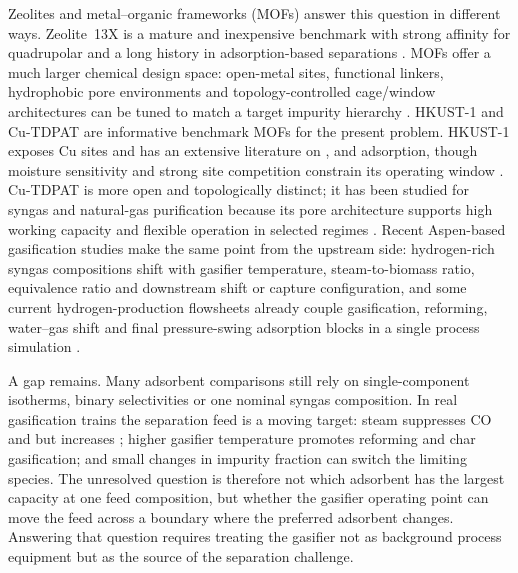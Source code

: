 \documentclass[11pt,a4paper]{article}
\newcommand{\Htwo}{\ce{H2}}
\newcommand{\COtwo}{\ce{CO2}}
\newcommand{\CHfour}{\ce{CH4}}
\newcommand{\PSA}{pressure-swing adsorption}
\begin{document}
Zeolites and metal--organic frameworks (MOFs) answer this question in different ways. Zeolite~13X is a mature and inexpensive benchmark with strong affinity for quadrupolar \COtwo{} and a long history in adsorption-based separations \citep{Streb2021Zeolite13X,Delgado2014PSAH2,Jedli2024Zeolite13X,Yang2025Layered13X}. MOFs offer a much larger chemical design space: open-metal sites, functional linkers, hydrophobic pore environments and topology-controlled cage/window architectures can be tuned to match a target impurity hierarchy \citep{Li2014MOFGasSeparation,AlNaddaf2018CoreShell,AlNaddaf2020Multicomponent}. HKUST-1 and Cu-TDPAT are informative benchmark MOFs for the present problem. HKUST-1 exposes Cu sites and has an extensive literature on \COtwo, \CHfour{} and \Htwo{} adsorption, though moisture sensitivity and strong site competition constrain its operating window \citep{Abid2023HKUST,Yin2018HKUSTCO,Zelenka2022HKUSTAmine,Rostom2024CuBTC}. Cu-TDPAT is more open and topologically distinct; it has been studied for syngas and natural-gas purification because its pore architecture supports high working capacity and flexible operation in selected regimes \citep{Wu2012CuTDPAT,Liu2014CuTDPAT,Asgari2021CuTDPAT}. Recent Aspen-based gasification studies make the same point from the upstream side: hydrogen-rich syngas compositions shift with gasifier temperature, steam-to-biomass ratio, equivalence ratio and downstream shift or capture configuration, and some current hydrogen-production flowsheets already couple gasification, reforming, water--gas shift and final \PSA{} blocks in a single process simulation \citep{Rosha2023MSWGasificationMEA,Matta2024OlivePomaceAspen}.

A gap remains. Many adsorbent comparisons still rely on single-component isotherms, binary selectivities or one nominal syngas composition. In real gasification trains the separation feed is a moving target: steam suppresses CO and \CHfour{} but increases \COtwo; higher gasifier temperature promotes reforming and char gasification; and small changes in impurity fraction can switch the limiting species. The unresolved question is therefore not which adsorbent has the largest capacity at one feed composition, but whether the gasifier operating point can move the feed across a boundary where the preferred adsorbent changes. Answering that question requires treating the gasifier not as background process equipment but as the source of the separation challenge.
\end{document}
